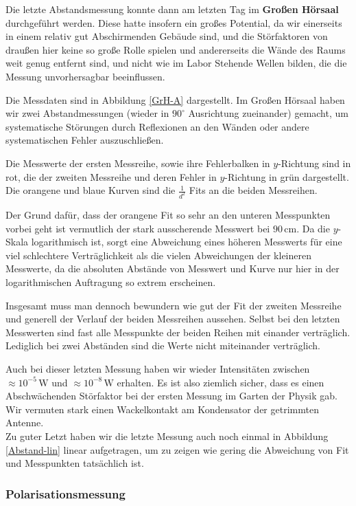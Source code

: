 \documentclass[titlepage,11pt,a4paper,ngerman]{article}
\newcommand{\tx}[1]{\textrm{#1}}
\begin{document}
\noindent
Die letzte Abstandsmessung konnte dann am letzten Tag im \textbf{Großen Hörsaal} durchgeführt werden. Diese hatte insofern ein großes Potential, da wir einerseits in einem relativ gut Abschirmenden Gebäude sind, und die Störfaktoren von draußen hier keine so große Rolle spielen und andererseits die Wände des Raums weit genug entfernt sind, und nicht wie im Labor Stehende Wellen bilden, die die Messung unvorhersagbar beeinflussen.\par
Die Messdaten sind in Abbildung \ref{GrH-A} dargestellt. Im Großen Hörsaal haben wir zwei Abstandmessungen (wieder in $ 90^\circ $ Ausrichtung zueinander) gemacht, um systematische Störungen durch Reflexionen an den Wänden oder andere systematischen Fehler auszuschließen.\par
Die Messwerte der ersten Messreihe, sowie ihre Fehlerbalken in $ y $-Richtung sind in rot, die der zweiten Messreihe und deren Fehler in $ y $-Richtung in grün dargestellt. Die orangene und blaue Kurven sind die $ \frac{1}{d^2} $ Fits an die beiden Messreihen.\par
Der Grund dafür, dass der orangene Fit so sehr an den unteren Messpunkten vorbei geht ist vermutlich der stark ausscherende Messwert bei $ 90 \, \tx{cm} $. Da die $ y $-Skala logarithmisch ist, sorgt eine Abweichung eines höheren Messwerts für eine viel schlechtere Verträglichkeit als die vielen Abweichungen der kleineren Messwerte, da die absoluten Abstände von Messwert und Kurve nur hier in der logarithmischen Auftragung so extrem erscheinen.\par
Insgesamt muss man dennoch bewundern wie gut der Fit der zweiten Messreihe und generell der Verlauf der beiden Messreihen aussehen. Selbst bei den letzten Messwerten sind fast alle Messpunkte der beiden Reihen mit einander verträglich. Lediglich bei zwei Abständen sind die Werte nicht miteinander verträglich.\par
Auch bei dieser letzten Messung haben wir wieder Intensitäten zwischen $ \approx 10^{-5} \, \tx{W} $ und $ \approx 10^{-8} \, \tx{W} $ erhalten. Es ist also ziemlich sicher, dass es einen Abschwächenden Störfaktor bei der ersten Messung im Garten der Physik gab. Wir vermuten stark einen Wackelkontakt am Kondensator der getrimmten Antenne.\\[10pt]
\noindent
Zu guter Letzt haben wir die letzte Messung auch noch einmal in Abbildung \ref{Abstand-lin} linear aufgetragen, um zu zeigen wie gering die Abweichung von Fit und Messpunkten tatsächlich ist.

\subsubsection{Polarisationsmessung}
\end{document}
